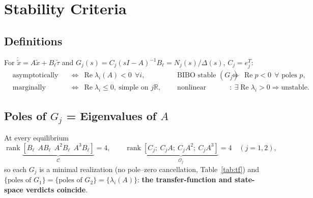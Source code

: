 \documentclass[10pt,letterpaper]{article}
\newenvironment{keep}{\par\noindent\begin{minipage}{\linewidth}}{\end{minipage}\par\smallskip}
\begin{document}
\begin{keep}
\section{Stability Criteria}
\subsection{Definitions}
For $\dot{\tilde x}=A\tilde x+B_\ell\tilde\tau$ and $G_j(s)=C_j(sI-A)^{-1}B_\ell=N_j(s)/\Delta(s)$, $C_j=e_j^T$:
\begin{equation}
\begin{aligned}
&\text{asymptotically stable} &&\Leftrightarrow\ \operatorname{Re}\lambda_i(A)<0\ \ \forall i, \qquad
&&\text{BIBO stable } (G_j) &&\Leftrightarrow\ \operatorname{Re}p<0\ \ \forall\text{ poles }p,\\
&\text{marginally stable} &&\Leftrightarrow\ \operatorname{Re}\lambda_i\le0,\ \text{simple on } j\mathbb R, \qquad
&&\text{nonlinear (Lyapunov indirect)} &&:\ \exists\operatorname{Re}\lambda_i>0\Rightarrow\text{unstable}.
\end{aligned}\label{eq:crit}
\end{equation}
\end{keep}
\begin{keep}
\subsection{Poles of $G_j$ = Eigenvalues of $A$}
At every equilibrium
\begin{equation*}
\operatorname{rank}\underbrace{[B_\ell\ \ AB_\ell\ \ A^2B_\ell\ \ A^3B_\ell]}_{\mathcal C}=4,\qquad
\operatorname{rank}\underbrace{[C_j;\ C_jA;\ C_jA^2;\ C_jA^3]}_{\mathcal O_j}=4\quad(j=1,2),
\end{equation*}
so each $G_j$ is a minimal realization (no pole--zero cancellation, Table~\ref{tab:tf}) and
$\{\text{poles of }G_1\}=\{\text{poles of }G_2\}=\{\lambda_i(A)\}$: \textbf{the transfer-function and state-space verdicts coincide}.
\end{keep}
\end{document}
